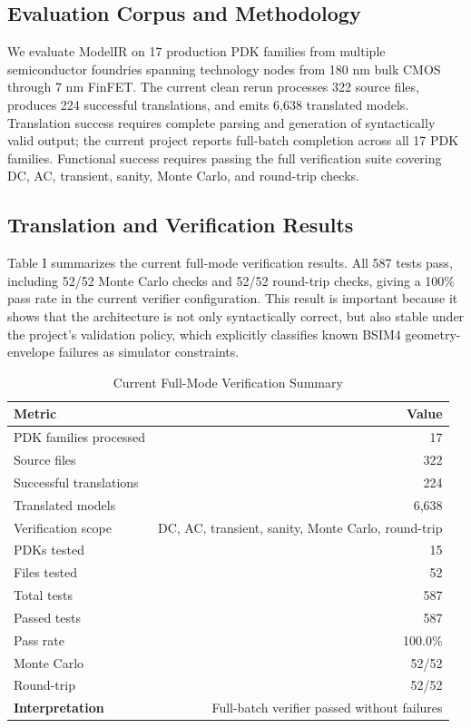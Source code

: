 \documentclass[10pt,twocolumn]{article}
\begin{document}
\subsection{Evaluation Corpus and Methodology}

We evaluate ModelIR on 17 production PDK families from multiple semiconductor foundries spanning technology nodes from 180 nm bulk CMOS through 7 nm FinFET. The current clean rerun processes 322 source files, produces 224 successful translations, and emits 6,638 translated models. Translation success requires complete parsing and generation of syntactically valid output; the current project reports full-batch completion across all 17 PDK families. Functional success requires passing the full verification suite covering DC, AC, transient, sanity, Monte Carlo, and round-trip checks.

\subsection{Translation and Verification Results}

Table I summarizes the current full-mode verification results. All 587 tests pass, including 52/52 Monte Carlo checks and 52/52 round-trip checks, giving a 100\% pass rate in the current verifier configuration. This result is important because it shows that the architecture is not only syntactically correct, but also stable under the project's validation policy, which explicitly classifies known BSIM4 geometry-envelope failures as simulator constraints.

\begin{table}[!t]
\caption{Current Full-Mode Verification Summary}
\centering
\renewcommand{\arraystretch}{1.1}
\begin{tabular}{@{}lr@{}}
\toprule
\textbf{Metric} & \textbf{Value} \\
\midrule
PDK families processed & 17 \\
Source files & 322 \\
Successful translations & 224 \\
Translated models & 6,638 \\
Verification scope & DC, AC, transient, sanity, Monte Carlo, round-trip \\
PDKs tested & 15 \\
Files tested & 52 \\
Total tests & 587 \\
Passed tests & 587 \\
Pass rate & 100.0\% \\
Monte Carlo & 52/52 \\
Round-trip & 52/52 \\
\midrule
\textbf{Interpretation} & Full-batch verifier passed without failures \\
\bottomrule
\end{tabular}
\end{table}
\end{document}
